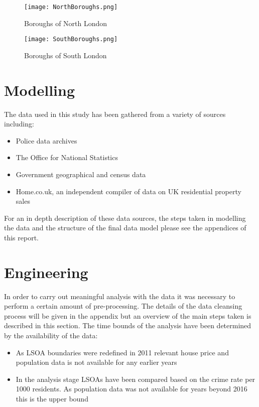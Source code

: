 \documentclass{article}
\begin{document}
\begin{figure}[H]
\begin{center}
  \texttt{[image: NorthBoroughs.png]}
  \caption{Boroughs of North London}
  \label{fig:NorthBoroughs}
\end{center}
\end{figure}

\begin{figure}[H]
\begin{center}
  \texttt{[image: SouthBoroughs.png]}
  \caption{Boroughs of South London}
  \label{fig:SouthBoroughs}
\end{center}
\end{figure}

\section{Modelling} \label{Modelling}
The data used in this study has been gathered from a variety of sources including:
\begin{itemize}
\item Police data archives
\item The Office for National Statistics
\item Government geographical and census data
\item Home.co.uk, an independent compiler of data on UK residential property sales
\end{itemize}

For an in depth description of these data sources, the steps taken in modelling the data and the structure of the final data model please see the appendices of this report.


\section{Engineering} \label{Engineering}
In order to carry out meaningful analysis with the data it was necessary to perform a certain amount of pre-processing. The details of the data cleansing process will be given in the appendix but an overview of the main steps taken is described in this section. The time bounds of the analysis have been determined by the availability of the data:

\begin{itemize}
\item As LSOA boundaries were redefined in 2011 relevant house price and population data is not available for any earlier years
\item In the analysis stage LSOAs have been compared based on the crime rate per 1000 residents. As population data was not available for years beyond 2016 this is the upper bound
\end{itemize}
\smallskip
\end{document}
